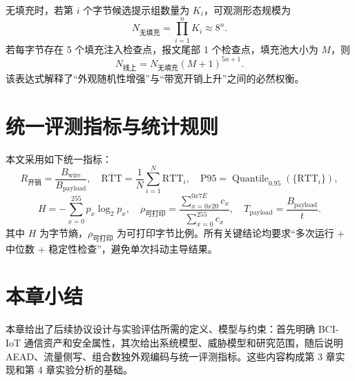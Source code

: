 无填充时，若第 $i$ 个字节候选提示组数量为 $K_i$，可观测形态规模为
\[
N_{\text{无填充}}=\prod_{i=1}^{n}K_i\approx 8^n.
\]
若每字节存在 5 个填充注入检查点，报文尾部 1 个检查点，填充池大小为 $M$，则
\[
N_{\text{线上}} = N_{\text{无填充}}(M+1)^{5n+1}.
\]
该表达式解释了“外观随机性增强”与“带宽开销上升”之间的必然权衡。

\section{统一评测指标与统计规则}
本文采用如下统一指标：
\[
R_{\text{开销}}=\frac{B_{\text{wire}}}{B_{\text{payload}}},
\quad
\overline{\mathrm{RTT}}=\frac{1}{N}\sum_{i=1}^{N}\mathrm{RTT}_i,
\quad
\mathrm{P95}=\operatorname{Quantile}_{0.95}(\{\mathrm{RTT}_i\}),
\]
\[
H=-\sum_{x=0}^{255}p_x\log_2 p_x,
\quad
\rho_{\text{可打印}}=\frac{\sum_{x=0x20}^{0x7E}c_x}{\sum_{x=0}^{255}c_x},
\quad
T_{\text{payload}}=\frac{B_{\text{payload}}}{t}.
\]
其中 $H$ 为字节熵，$\rho_{\text{可打印}}$ 为可打印字节比例。所有关键结论均要求“多次运行 + 中位数 + 稳定性检查”，避免单次抖动主导结果。

\section{本章小结}
本章给出了后续协议设计与实验评估所需的定义、模型与约束：首先明确 BCI-IoT 通信资产和安全属性，其次给出系统模型、威胁模型和研究范围，随后说明 AEAD、流量侧写、组合数独外观编码与统一评测指标。这些内容构成第 3 章实现和第 4 章实验分析的基础。
